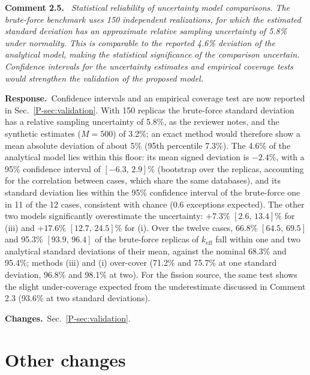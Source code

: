\documentclass[11pt]{article}
\newenvironment{revcomment}[1]
  {\par\medskip\noindent\textbf{Comment #1.}\ \itshape}
  {\par}
\newcommand{\response}{\par\noindent\textbf{Response.}\ }
\newcommand{\changes}{\par\noindent\textbf{Changes.}\ }
\begin{document}
\begin{revcomment}{2.5}
Statistical reliability of uncertainty model comparisons. The brute-force benchmark uses 150 independent realizations, for which the estimated standard deviation has an approximate relative sampling uncertainty of 5.8\% under normality. This is comparable to the reported 4.6\% deviation of the analytical model, making the statistical significance of the comparison uncertain. Confidence intervals for the uncertainty estimates and empirical coverage tests would strengthen the validation of the proposed model.
\end{revcomment}
\response Confidence intervals and an empirical coverage test are now reported in Sec.~\ref{P-sec:validation}. With 150 replicas the brute-force standard deviation has a relative sampling uncertainty of 5.8\%, as the reviewer notes, and the synthetic estimates ($M=500$) of 3.2\%; an exact method would therefore show a mean absolute deviation of about 5\% (95th percentile 7.3\%). The 4.6\% of the analytical model lies within this floor: its mean signed deviation is $-2.4\%$, with a 95\% confidence interval of $[-6.3,\,2.9]\%$ (bootstrap over the replicas, accounting for the correlation between cases, which share the same databases), and its standard deviation lies within the 95\% confidence interval of the brute-force one in 11 of the 12 cases, consistent with chance (0.6 exceptions expected). The other two models significantly overestimate the uncertainty: $+7.3\%$ $[2.6,\,13.4]\%$ for (iii) and $+17.6\%$ $[12.7,\,24.5]\%$ for (i).
Over the twelve cases, 66.8\% $[64.5,\,69.5]$ and 95.3\% $[93.9,\,96.4]$ of the brute-force replicas of $k_{\text{eff}}$ fall within one and two analytical standard deviations of their mean, against the nominal 68.3\% and 95.4\%; methods (iii) and (i) over-cover (71.2\% and 75.7\% at one standard deviation, 96.8\% and 98.1\% at two). For the fission source, the same test shows the slight under-coverage expected from the underestimate discussed in Comment 2.3 (93.6\% at two standard deviations).
\changes Sec.~\ref{P-sec:validation}.

\section*{Other changes}
\end{document}

